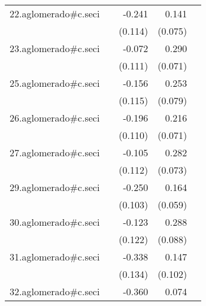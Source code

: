 {\begin{longtable}{l*{4}{D{.}{.}{-1}}}
\addlinespace
22.aglomerado#c.seci&                     &      -0.241\sym{*}  &       0.141         &                     \\
            &                     &     (0.114)         &     (0.075)         &                     \\
\addlinespace
23.aglomerado#c.seci&                     &      -0.072         &       0.290\sym{***}&                     \\
            &                     &     (0.111)         &     (0.071)         &                     \\
\addlinespace
25.aglomerado#c.seci&                     &      -0.156         &       0.253\sym{**} &                     \\
            &                     &     (0.115)         &     (0.079)         &                     \\
\addlinespace
26.aglomerado#c.seci&                     &      -0.196         &       0.216\sym{**} &                     \\
            &                     &     (0.110)         &     (0.071)         &                     \\
\addlinespace
27.aglomerado#c.seci&                     &      -0.105         &       0.282\sym{***}&                     \\
            &                     &     (0.112)         &     (0.073)         &                     \\
\addlinespace
29.aglomerado#c.seci&                     &      -0.250\sym{*}  &       0.164\sym{**} &                     \\
            &                     &     (0.103)         &     (0.059)         &                     \\
\addlinespace
30.aglomerado#c.seci&                     &      -0.123         &       0.288\sym{**} &                     \\
            &                     &     (0.122)         &     (0.088)         &                     \\
\addlinespace
31.aglomerado#c.seci&                     &      -0.338\sym{*}  &       0.147         &                     \\
            &                     &     (0.134)         &     (0.102)         &                     \\
\addlinespace
32.aglomerado#c.seci&                     &      -0.360\sym{**} &       0.074         &                     \\

\end{longtable}}

